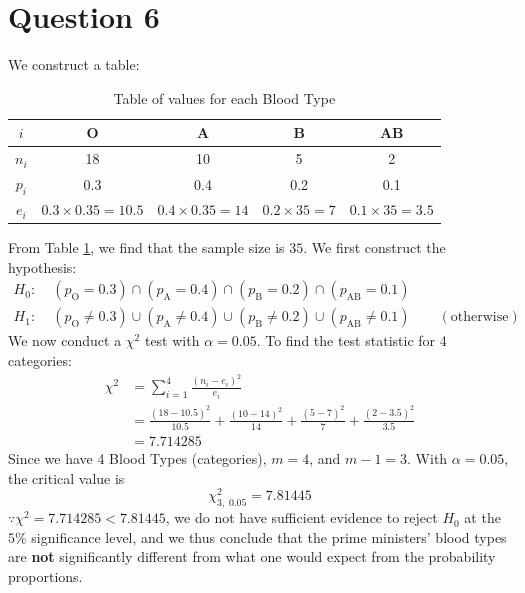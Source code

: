 \documentclass[12pt]{article}
\begin{document}
\section*{Question 6}

We construct a table: 

\begin{table}[H]
    \centering
    \begin{tabular}{| c | c | c | c | c |}
        \hline $i$ & \textbf{O} & \textbf{A} & \textbf{B} & \textbf{AB} \\ \hline 
        $n_i$ & 18 & 10 & 5 & 2 \\ \hline 
        $p_i$ & 0.3 & 0.4 & 0.2 & 0.1 \\ \hline 
        $e_i$ & $0.3 \times 0.35 = 10.5$ & $0.4\times 0.35 = 14$ & $0.2 \times 35 = 7$ & $0.1 \times 35 = 3.5$ \\ \hline 
    \end{tabular}
    \caption{Table of values for each Blood Type}
    \label{6-table}
\end{table}

\noindent From Table \ref{6-table}, we find that the sample size is $35$. We first construct the hypothesis: \begin{align*}
    H_{0}: & \; (p_{\text{O}} = 0.3) \cap (p_{\text{A}} = 0.4) \cap (p_{\text{B}} = 0.2) \cap (p_{\text{AB}} = 0.1) \\  
    H_{1}: & \; (p_{\text{O}} \neq 0.3) \cup (p_{\text{A}} \neq 0.4) \cup (p_{\text{B}} \neq 0.2) \cup (p_{\text{AB}} \neq 0.1) \qquad (\text{otherwise})
\end{align*} We now conduct a $\chi^{2}$ test with $\alpha = 0.05$. To find the test statistic for 4 categories: \begin{align*}
    \chi^{2} &= \sum_{i=1}^{4} \frac{(n_i - e_i)^{2}}{e_i} \\ 
    &= \frac{(18-10.5)^{2}}{10.5} + \frac{(10-14)^{2}}{14} + \frac{(5-7)^{2}}{7} + \frac{(2-3.5)^{2}}{3.5} \\ 
    &= \boxed{7.714285}
\end{align*} Since we have 4 Blood Types (categories), $m = 4$, and $m-1 = 3$. With $\alpha = 0.05$, the critical value is \begin{equation*}
    \chi^2_{3, \; 0.05} = 7.81445
\end{equation*} $\because \chi^{2} = 7.714285 < 7.81445$, we do not have sufficient evidence to reject $H_{0}$ at the $5\%$ significance level, and we thus conclude that the prime ministers' blood types are \textbf{not} significantly different from what one would expect from the probability proportions.
\end{document}
